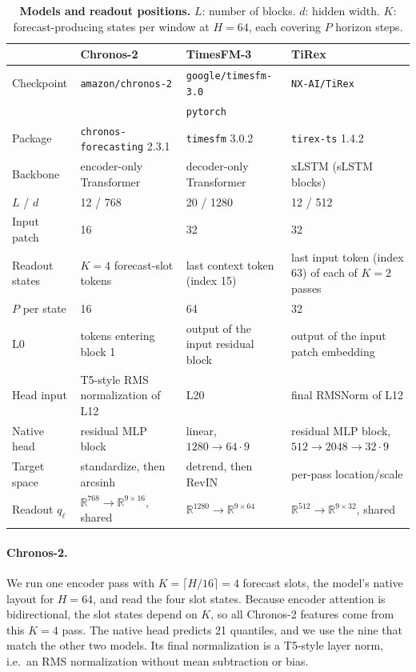 \documentclass{article} %
\begin{document}
\begin{table}[h]
  \centering
  \small
  \caption{\textbf{Models and readout positions.} $L$: number of blocks. $d$: hidden width.
  $K$: forecast-producing states per window at $H=64$, each covering $P$ horizon steps.}
  \label{tab:models}
  \begin{tabularx}{\textwidth}{@{}lXXX@{}}
    \toprule
    & Chronos-2 & TimesFM-3 & TiRex \\
    \midrule
    Checkpoint & \texttt{amazon/chronos-2} & \texttt{google/timesfm-3.0} & \texttt{NX-AI/TiRex} \\
     &  & \texttt{pytorch} &  \\
    Package & \texttt{chronos-forecasting} 2.3.1 & \texttt{timesfm} 3.0.2 & \texttt{tirex-ts} 1.4.2 \\
    Backbone & encoder-only Transformer & decoder-only Transformer & xLSTM (sLSTM blocks) \\
    $L$ / $d$ & 12 / 768 & 20 / 1280 & 12 / 512 \\
    Input patch & 16 & 32 & 32 \\
    Readout states & $K{=}4$ forecast-slot tokens & last context token (index 15) & last input token (index 63) of each of $K{=}2$ passes \\
    $P$ per state & 16 & 64 & 32 \\
    $\mathrm{L}0$ & tokens entering block 1 & output of the input residual block & output of the input patch embedding \\
    Head input & T5-style RMS normalization of L12 & L20 & final RMSNorm of L12 \\
    Native head & residual MLP block & linear, $1280\to 64\cdot 9$ & residual MLP block, $512\to 2048\to 32\cdot 9$ \\
    Target space & standardize, then arcsinh & detrend, then RevIN & per-pass location/scale \\
    Readout $q_\ell$ & $\mathbb{R}^{768}\!\to\!\mathbb{R}^{9\times 16}$, shared & $\mathbb{R}^{1280}\!\to\!\mathbb{R}^{9\times 64}$ & $\mathbb{R}^{512}\!\to\!\mathbb{R}^{9\times 32}$, shared \\
    \bottomrule
  \end{tabularx}
\end{table}

\paragraph{Chronos-2.} We run one encoder pass with $K=\lceil H/16\rceil=4$ forecast slots, the model's native layout for $H=64$, and read the four slot states. Because encoder attention is bidirectional, the slot states depend on $K$, so all Chronos-2 features come from this $K=4$ pass. The native head predicts 21 quantiles, and we use the nine that match the other two models. Its final normalization is a T5-style layer norm, i.e.\ an RMS normalization without mean subtraction or bias.
\end{document}
